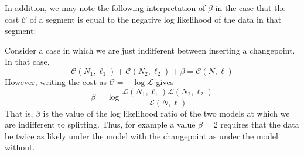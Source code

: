 \documentclass[11pt]{article}
\begin{document}
In addition, we may note the following interpretation of $\beta$ in the case that the cost $\mathcal{C}$ of a segment is equal to the negative log likelihood of the data in that segment:

Consider a case in which we are just indifferent between inserting a changepoint. In that case,
\begin{equation}
    \mathcal{C}(N_1, \ell_1) + \mathcal{C}(N_2, \ell_2) + \beta = \mathcal{C}(N, \ell)
\end{equation}
However, writing the cost as $\mathcal{C} = -\log \mathcal{L}$ gives
\begin{equation}
    \beta = \log \frac{\mathcal{L}(N_1, \ell_1)\mathcal{L}(N_2, \ell_2)}{\mathcal{L}(N, \ell)}
\end{equation}
That is, $\beta$ is the value of the log likelihood ratio of the two models at which we are indifferent to splitting. Thus, for example a value $\beta = 2$ requires that the data be twice as likely under the model with the changepoint as under the model without.
\end{document}
